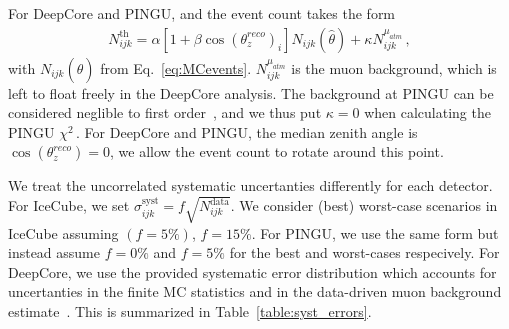 \documentclass[draft=True]{revtex4-2}
\newcommand{\zreco}{\ensuremath{\cos{(\theta_z^{reco})}}}
\begin{document}
For DeepCore and PINGU, and the event count takes the form
\begin{align}
    N^\text{th}_{ijk} = \alpha\left[1+\beta \zreco_i \right] N_{ijk}(\hat{\theta}) + \kappa N_{ijk}^{\mu_{atm}}\,,
\end{align}
with $N_{ijk}(\hat{\theta})$ from Eq.~\ref{eq:MCevents}. $N_{ijk}^{\mu_{atm}}$ is the muon background, which is left to float freely in the DeepCore analysis.
The background at PINGU can be considered neglible to first order~\cite{PINGUdata}, and we thus put $\kappa=0$ when calculating the PINGU $\chi^2$\,. 
For DeepCore and PINGU, the median zenith angle is $\zreco = 0$, we allow the event count to rotate around this point.

We treat the uncorrelated systematic uncertanties differently for each detector. For IceCube, we set $\sigma_{ijk}^\text{syst} = f\sqrt{N_{ijk}^\text{data}}$. We consider (best) worst-case scenarios in IceCube assuming
$(f=5\%)$, $f=15\%$. For PINGU, we use the same form but instead assume $f=0\%$ and $f=5\%$ for the best and worst-cases respecively. %
For DeepCore, we use the provided systematic error distribution which accounts for uncertanties in the finite MC statistics and in the data-driven 
muon background estimate~\cite{DC2019data}. This is summarized in Table~\ref{table:syst_errors}.  %
\end{document}
